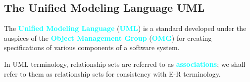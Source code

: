 \documentclass[a4paper,12pt,twoside,openany]{book}
\newcommand{\textcy}[1]{\textbf{\textcolor{cyan}{#1}}}
\begin{document}
\subsection{The Unified Modeling Language UML}

The \textcy{Unified Modeling Language} (\textcy{UML}) is a standard developed under the auspices of the \textcy{Object Management Group} (\textcy{OMG}) for creating specifications of various components of a software system.

In UML terminology, relationship sets are referred to as \textcy{associations}; we shall refer to them as relationship sets for consistency with E-R terminology.

\end{document}
